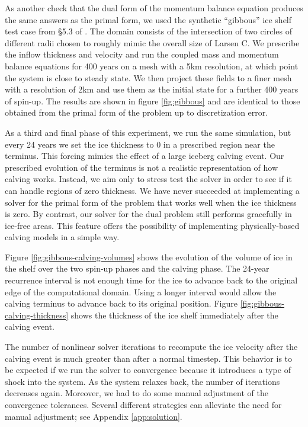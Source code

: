 \documentclass[twocolumn,letterpaper]{igs}
\begin{document}
As another check that the dual form of the momentum balance equation produces the same answers as the primal form, we used the synthetic ``gibbous'' ice shelf test case from \S5.3 of \citet{shapero2021icepack}.
The domain consists of the intersection of two circles of different radii chosen to roughly mimic the overall size of Larsen C.
We prescribe the inflow thickness and velocity and run the coupled mass and momentum balance equations for 400 years on a mesh with a 5km resolution, at which point the system is close to steady state.
We then project these fields to a finer mesh with a resolution of 2km and use them as the initial state for a further 400 years of spin-up.
The results are shown in figure \ref{fig:gibbous} and are identical to those obtained from the primal form of the problem up to discretization error.

As a third and final phase of this experiment, we run the same simulation, but every 24 years we set the ice thickness to 0 in a prescribed region near the terminus.
This forcing mimics the effect of a large iceberg calving event.
Our prescribed evolution of the terminus is not a realistic representation of how calving works.
Instead, we aim only to stress test the solver in order to see if it can handle regions of zero thickness.
We have never succeeded at implementing a solver for the primal form of the problem that works well when the ice thickness is zero.
By contrast, our solver for the dual problem still performs gracefully in ice-free areas.
This feature offers the possibility of implementing physically-based calving models in a simple way.

Figure \ref{fig:gibbous-calving-volumes} shows the evolution of the volume of ice in the shelf over the two spin-up phases and the calving phase.
The 24-year recurrence interval is not enough time for the ice to advance back to the original edge of the computational domain.
Using a longer interval would allow the calving terminus to advance back to its original position.
Figure \ref{fig:gibbous-calving-thickness} shows the thickness of the ice shelf immediately after the calving event.

The number of nonlinear solver iterations to recompute the ice velocity after the calving event is much greater than after a normal timestep.
This behavior is to be expected if we run the solver to convergence because it introduces a type of shock into the system.
As the system relaxes back, the number of iterations decreases again.
Moreover, we had to do some manual adjustment of the convergence tolerances.
Several different strategies can alleviate the need for manual adjustment; see Appendix \ref{app:solution}.
\end{document}
